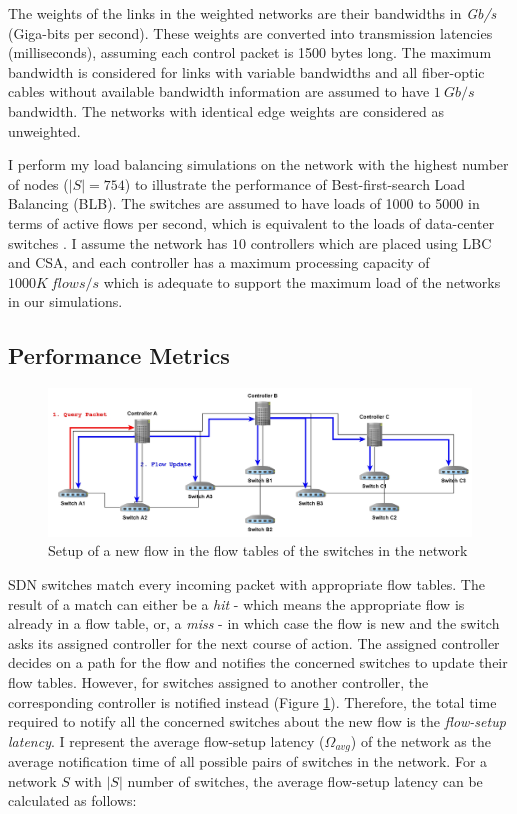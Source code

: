\documentclass[preprint,12pt]{elsarticle}
\begin{document}
	The weights of the links in the weighted networks are their bandwidths in \textit{Gb/s} (Giga-bits per second). These weights are converted into transmission latencies (milliseconds), assuming each control packet is 1500 bytes long. The maximum bandwidth is considered for links with variable bandwidths and all fiber-optic cables without available bandwidth information are assumed to have $1~Gb/s$ bandwidth. The networks with identical edge weights are considered as unweighted.
	
	I perform my load balancing simulations on the network with the highest number of nodes ($|S|=754$) to illustrate the performance of Best-first-search Load Balancing (BLB). The switches are assumed to have loads of 1000 to 5000 in terms of active flows per second, which is equivalent to the loads of data-center switches \cite{benson2010network}. I assume the network has $10$ controllers which are placed using LBC and CSA, and each controller has a maximum processing capacity of $1000K~flows/s$ which is adequate to support the maximum load of the networks in our simulations.
	\subsection{Performance Metrics}
	
	\begin{figure}
		\centering
		\includegraphics[width=\textwidth]{Images/new_flow.jpg}
		\caption{Setup of a new flow in the flow tables of the switches in the network} \label{new_flow}
	\end{figure}
	
	SDN switches match every incoming packet with appropriate flow tables. The result of a match can either be a \textit{hit} - which means the appropriate flow is already in a flow table, or, a \textit{miss} - in which case the flow is new and the switch asks its assigned controller for the next course of action. The assigned controller decides on a path for the flow and notifies the concerned switches to update their flow tables. However, for switches assigned to another controller, the corresponding controller is notified instead (Figure \ref{new_flow}). Therefore, the total time required to notify all the concerned switches about the new flow is the \textit{flow-setup latency}. I represent the average flow-setup latency ($\Omega_{avg}$) of the network as the average notification time of all possible pairs of switches in the network. For a network $S$ with $|S|$ number of switches, the average flow-setup latency can be calculated as follows:
	
\end{document}
